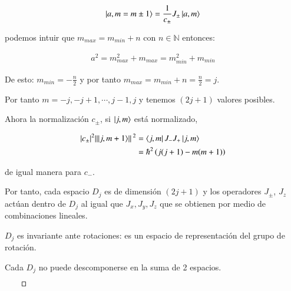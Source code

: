 \begin{align}
    \ket{a,m=m\pm1}=\frac{1}{c_\pm}J_\pm\ket{a,m}
\end{align}

podemos intuir que $m_{max}=m_{min}+n$ con $n\in \mathbb{N}$ entonces:

\begin{align}
    a^2=m^2_{max}+m_{max}=m_{min}^2+m_{min}
\end{align}

De esto: $m_{min}=-\frac{n}{2}$ y por tanto $m_{max}=m_{min}+n=\frac{n}{2}=j$.

Por tanto $m=-j,-j+1,\cdots,j-1,j$ y tenemos $(2j+1)$ valores posibles.

Ahora la normalización $c_\pm$, si $\ket{j,m}$ está normalizado,

\begin{align*}
    \abs{c_{\pm}}^2\norm*{\ket{j,m+1}}^2
        &=\bra{j,m}J_-J_+\ket{j,m}\\
        &=\hbar^2 \left(j(j+1)-m(m+1)\right)
\end{align*}

de igual manera para $c_-$.

Por tanto, cada espacio $D_j$ es de dimensión $(2j+1)$ y los operadores $J_\pm$, $J_z$ actúan dentro de $D_j$ al igual que $J_x,J_y,J_z$ que se obtienen por medio de combinaciones lineales. 

$D_j$ es invariante ante rotaciones: es un espacio de representación del grupo de rotación.

Cada $D_j$ no puede descomponerse en la suma de 2 espacios. 

\hfill$\qed$